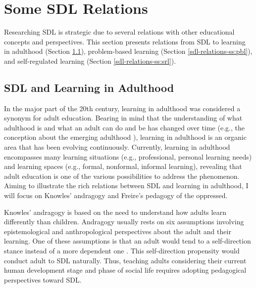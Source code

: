 \section{Some SDL Relations}
\label{sdl-sec:relations}

Researching \gls{SDL} is strategic due to several relations with other educational concepts and perspectives. This section presents relations from \gls{SDL} to learning in adulthood (Section \ref{sdl-relations-ss:andragogy}), problem-based learning (Section \ref{sdl-relations-ss:pbl}), and self-regulated learning (Section \ref{sdl-relations-ss:srl}).

\subsection{SDL and Learning in Adulthood}
\label{sdl-relations-ss:andragogy}

In the major part of the 20th century,  learning in adulthood was considered a synonym for adult education. Bearing in mind that the understanding of what adulthood is and what an adult can do and be has changed over time (e.g., the conception about the emerging adulthood \cite{parameswaran:2020}), learning in adulthood is an organic area that has been evolving continuously. Currently, learning in adulthood encompasses many learning situations (e.g., professional, personal learning needs) and learning spaces (e.g., formal, nonformal, informal learning), revealing that adult education is one of the various possibilities to address the phenomenon. Aiming to illustrate the rich relations between \gls{SDL} and learning in adulthood, I will focus on Knowles' andragogy and Freire's pedagogy of the oppressed.

Knowles' andragogy \cite{knowles:2005} is based on the need to understand how adults learn differently than children. Andragogy usually rests on six assumptions involving epistemological and anthropological perspectives about the adult and their learning. One of these assumptions is that an adult would tend to a self-direction stance instead of a more dependent one \cite[p.~84]{merriam:2007}. This self-direction propensity would conduct adult to  \gls{SDL} naturally. Thus, teaching adults considering their current human development stage and phase of social life requires adopting pedagogical perspectives toward \gls{SDL}.

